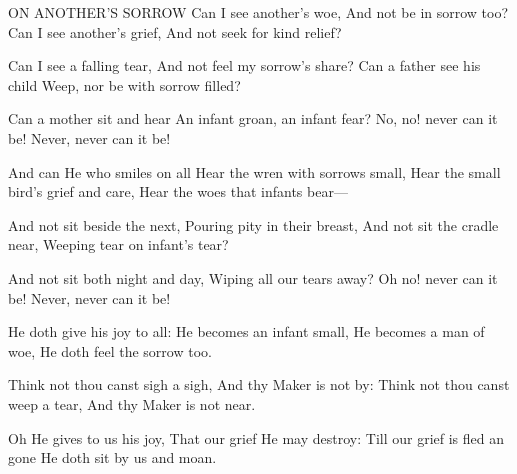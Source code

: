 ON ANOTHER'S SORROW
   Can I see another's woe,
   And not be in sorrow too?
   Can I see another's grief,
   And not seek for kind relief?

   Can I see a falling tear,
   And not feel my sorrow's share?
   Can a father see his child
   Weep, nor be with sorrow filled?

   Can a mother sit and hear
   An infant groan, an infant fear?
   No, no! never can it be!
   Never, never can it be!
   
   And can He who smiles on all
   Hear the wren with sorrows small,
   Hear the small bird's grief and care,
   Hear the woes that infants bear—
   
   And not sit beside the next,
   Pouring pity in their breast,
   And not sit the cradle near,
   Weeping tear on infant's tear?
   
   And not sit both night and day,
   Wiping all our tears away?
   Oh no! never can it be!
   Never, never can it be!
   
   He doth give his joy to all:
   He becomes an infant small,
   He becomes a man of woe,
   He doth feel the sorrow too.
   
   Think not thou canst sigh a sigh,
   And thy Maker is not by:
   Think not thou canst weep a tear,
   And thy Maker is not near.
   
   Oh He gives to us his joy,
   That our grief He may destroy:
   Till our grief is fled an gone
   He doth sit by us and moan.